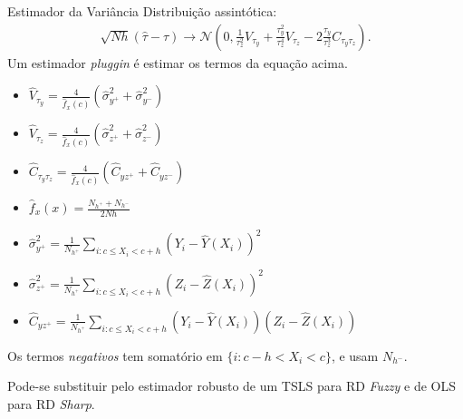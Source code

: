 \documentclass[aspectratio=1610, 10pt]{beamer}
\begin{document}
\begin{frame}{Estimador da Variância}
    \justifying
        Distribuição assintótica:
        \begin{align*}
            \sqrt{Nh}(\hat{\tau}-\tau) \rightarrow \mathcal{N} \left( 0,\frac{1}{\tau^2_z}V_{\tau_y}+\frac{\tau^2_y}{\tau^4_z}V_{\tau_z}-2\frac{\tau_y}{\tau^3_z}C_{\tau_y\tau_z} \right).
        \end{align*}
    Um estimador \emph{pluggin} é estimar os termos da equação acima.
    \begin{multicols}{2}[\setlength{\columnsep}{-2cm}]
    \begin{itemize}
        \item $\hat{V}_{\tau_y} = \frac{4}{\hat{f}_x(c)}(\hat{\sigma}^2_{y^+} + \hat{\sigma}^2_{y^-})$
        \item $\hat{V}_{\tau_z} = \frac{4}{\hat{f}_x(c)}(\hat{\sigma}^2_{z^+} + \hat{\sigma}^2_{z^-})$
        \item $\hat{C}_{\tau_y\tau_z} = \frac{4}{\hat{f}_x(c)}(\hat{C}_{yz^+}+\hat{C}_{yz^-})$
        \item $\hat{f}_x(x) = \frac{N_{h^+}+N_{h^-}}{2Nh}$
        \item $\hat{\sigma}^2_{y^+} = \frac{1}{N_{h^+}} \sum_{i:c \leq X_i < c+h} (Y_i - \hat{Y}(X_i))^2$
        \item $\hat{\sigma}^2_{z^+} = \frac{1}{N_{h^+}} \sum_{i:c \leq X_i < c+h} (Z_i - \hat{Z}(X_i))^2$
        \item $\hat{C}_{yz^+} = \frac{1}{N_{h^+}} \sum_{i:c \leq X_i < c+h} (Y_i - \hat{Y}(X_i))(Z_i - \hat{Z}(X_i))$
    \end{itemize}
    \end{multicols}

    Os termos \emph{negativos} tem somatório em $\{i:c-h < X_i < c\}$, e usam $N_{h^-}$.

    \vspace{0.1cm}
    Pode-se substituir pelo estimador robusto de um TSLS para RD \emph{Fuzzy} e de OLS para RD \emph{Sharp}.
\end{frame}




\end{document}
